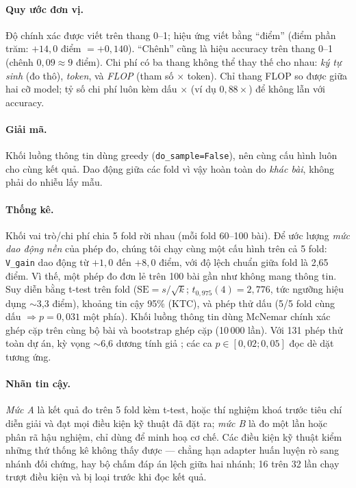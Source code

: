 \paragraph{Quy ước đơn vị.} Độ chính xác được viết trên thang 0--1; hiệu ứng viết bằng ``điểm''
(điểm phần trăm: $+14{,}0$ điểm $= +0{,}140$). ``Chênh'' cũng là hiệu accuracy trên thang 0--1
(chênh $0{,}09 \approx 9$ điểm). Chi phí có ba thang không thể thay thế cho nhau: \emph{ký tự
sinh} (đo thô), \emph{token}, và \emph{FLOP} (tham số $\times$ token). Chỉ thang FLOP so được
giữa hai cỡ model; tỷ số chi phí luôn kèm dấu $\times$ (ví dụ $0{,}88\times$) để không lẫn với
accuracy.

\paragraph{Giải mã.} Khối luồng thông tin dùng greedy (\texttt{do\_sample=False}), nên cùng
cấu hình luôn cho cùng kết quả. Dao động giữa các fold vì vậy hoàn toàn do \emph{khác bài},
không phải do nhiễu lấy mẫu.

\paragraph{Thống kê.} Khối vai trò/chi phí chia 5 fold rời nhau (mỗi fold 60--100 bài). Để
ước lượng \emph{mức dao động nền} của phép đo, chúng tôi chạy cùng một
cấu hình trên cả 5 fold: \texttt{V\_gain} dao động từ $+1{,}0$ đến $+8{,}0$ điểm, với độ lệch
chuẩn giữa fold là 2,65 điểm. Vì thế, một phép đo đơn lẻ trên 100 bài gần như không mang thông
tin. Suy diễn bằng t-test trên fold ($\mathrm{SE}=s/\sqrt{k}$;
$t_{0{,}975}(4)=2{,}776$, tức ngưỡng hiệu dụng $\sim$3,3 điểm), khoảng tin cậy 95\% (KTC), và
phép thử dấu (5/5 fold cùng dấu $\Rightarrow p=0{,}031$ một phía). Khối luồng thông tin dùng
McNemar chính xác ghép cặp trên cùng bộ bài và bootstrap ghép cặp (10\,000 lần). Với 131 phép
thử toàn dự án, kỳ vọng $\sim$6,6 dương tính giả \cite{bh1995}; các ca $p \in [0{,}02;0{,}05]$
đọc dè dặt tương ứng.

\paragraph{Nhãn tin cậy.} \emph{Mức A} là kết quả đo trên 5 fold kèm t-test, hoặc thí nghiệm
khoá trước tiêu chí diễn giải và đạt mọi điều kiện kỹ thuật đã đặt ra; \emph{mức B} là đo một
lần hoặc phân rã hậu nghiệm, chỉ dùng để minh hoạ cơ chế. Các điều kiện kỹ thuật kiểm những thứ
thống kê không thấy được --- chẳng hạn adapter huấn luyện rò sang nhánh đối chứng, hay bộ chấm
đáp án lệch giữa hai nhánh; 16 trên 32 lần chạy trượt điều kiện và bị loại trước khi đọc kết quả.

